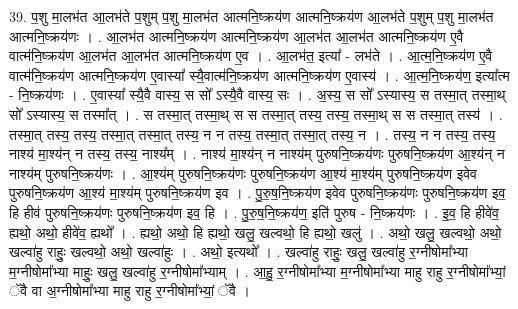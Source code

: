 \documentclass[17pt]{extarticle}
\begin{document}
39. प॒शु मा॒लभ॑त आ॒लभ॑ते प॒शुम् प॒शु मा॒लभ॑त आत्मनि॒ष्क्रय॑ण आत्मनि॒ष्क्रय॑ण आ॒लभ॑ते प॒शुम् प॒शु मा॒लभ॑त आत्मनि॒ष्क्रय॑णः । . आ॒लभ॑त आत्मनि॒ष्क्रय॑ण आत्मनि॒ष्क्रय॑ण आ॒लभ॑त आ॒लभ॑त आत्मनि॒ष्क्रय॑ण ए॒वै वात्म॑नि॒ष्क्रय॑ण आ॒लभ॑त आ॒लभ॑त आत्मनि॒ष्क्रय॑ण ए॒व । . आ॒लभ॑त॒ इत्या᳚ - लभ॑ते । . आ॒त्म॒नि॒ष्क्रय॑ण ए॒वै वात्म॑नि॒ष्क्रय॑ण आत्मनि॒ष्क्रय॑ण ए॒वास्या᳚ स्यै॒वात्म॑नि॒ष्क्रय॑ण आत्मनि॒ष्क्रय॑ण ए॒वास्य॑ । . आ॒त्म॒नि॒ष्क्रय॑ण॒ इत्या᳚त्म - नि॒ष्क्रय॑णः । . ए॒वास्या᳚ स्यै॒वै वास्य॒ स सो᳚ ऽस्यै॒वै वास्य॒ सः । . अ॒स्य॒ स सो᳚ ऽस्यास्य॒ स तस्मा॒त् तस्मा॒थ् सो᳚ ऽस्यास्य॒ स तस्मा᳚त् । . स तस्मा॒त् तस्मा॒थ् स स तस्मा॒त् तस्य॒ तस्य॒ तस्मा॒थ् स स तस्मा॒त् तस्य॑ । . तस्मा॒त् तस्य॒ तस्य॒ तस्मा॒त् तस्मा॒त् तस्य॒ न न तस्य॒ तस्मा॒त् तस्मा॒त् तस्य॒ न । . तस्य॒ न न तस्य॒ तस्य॒ नाश्य॑ मा॒श्य॑न् न तस्य॒ तस्य॒ नाश्य᳚म् । . नाश्य॑ मा॒श्य॑न् न नाश्य॑म् पुरुषनि॒ष्क्रय॑णः पुरुषनि॒ष्क्रय॑ण आ॒श्य॑न् न नाश्य॑म् पुरुषनि॒ष्क्रय॑णः । . आ॒श्य॑म् पुरुषनि॒ष्क्रय॑णः पुरुषनि॒ष्क्रय॑ण आ॒श्य॑ मा॒श्य॑म् पुरुषनि॒ष्क्रय॑ण इवेव पुरुषनि॒ष्क्रय॑ण आ॒श्य॑ मा॒श्य॑म् पुरुषनि॒ष्क्रय॑ण इव । . पु॒रु॒ष॒नि॒ष्क्रय॑ण इवेव पुरुषनि॒ष्क्रय॑णः पुरुषनि॒ष्क्रय॑ण इव॒ हि हीव॑ पुरुषनि॒ष्क्रय॑णः पुरुषनि॒ष्क्रय॑ण इव॒ हि । . पु॒रु॒ष॒नि॒ष्क्रय॑ण॒ इति॑ पुरुष - नि॒ष्क्रय॑णः । . इ॒व॒ हि हीवे॑व॒ ह्यथो॒ अथो॒ हीवे॑व॒ ह्यथो᳚ । . ह्यथो॒ अथो॒ हि ह्यथो॒ खलु॒ खल्वथो॒ हि ह्यथो॒ खलु॑ । . अथो॒ खलु॒ खल्वथो॒ अथो॒ खल्वा॑हु राहुः॒ खल्वथो॒ अथो॒ खल्वा॑हुः । . अथो॒ इत्यथो᳚ । . खल्वा॑हु राहुः॒ खलु॒ खल्वा॑हु र॒ग्नीषोमा᳚भ्या म॒ग्नीषोमा᳚भ्या माहुः॒ खलु॒ खल्वा॑हु र॒ग्नीषोमा᳚भ्याम् । . आ॒हु॒ र॒ग्नीषोमा᳚भ्या म॒ग्नीषोमा᳚भ्या माहु राहु र॒ग्नीषोमा᳚भ्यां॒ ॅवै वा अ॒ग्नीषोमा᳚भ्या माहु राहु र॒ग्नीषोमा᳚भ्यां॒ ॅवै । \newline
\end{document}
